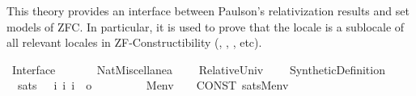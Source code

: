 %
\begin{isabellebody}%
%
%
\isadelimdocument
%
\endisadelimdocument
%
\isatagdocument
%
\isamarkuptrue%
%
\endisatagdocument
{\isafolddocument}%
%
\isadelimdocument
%
\endisadelimdocument
%
\begin{isamarkuptext}%
This theory provides an interface between Paulson's
relativization results and set models of ZFC. In particular,
it is used to prove that the locale  is
a sublocale of all relevant locales in ZF-Constructibility
(, , , etc).%
\end{isamarkuptext}\isamarkuptrue%
%
\isadelimtheory
%
\endisadelimtheory
%
\isatagtheory
{}\isamarkupfalse%
\ Interface\isanewline
\ \ \isanewline
\ \ \ \ Nat{\isacharunderscore}{\kern0pt}Miscellanea\isanewline
\ \ \ \ Relative{\isacharunderscore}{\kern0pt}Univ\isanewline
\ \ \ \ Synthetic{\isacharunderscore}{\kern0pt}Definition\isanewline
{}%
\endisatagtheory
{\isafoldtheory}%
%
\isadelimtheory
%
\endisadelimtheory
\isanewline
\isanewline
{}\isamarkupfalse%
\isanewline
\ \ {\isachardoublequoteopen}{\isacharunderscore}{\kern0pt}sats{\isachardoublequoteclose}\ \ {\isacharcolon}{\kern0pt}{\isacharcolon}{\kern0pt}\ {\isachardoublequoteopen}{\isacharbrackleft}{\kern0pt}i{\isacharcomma}{\kern0pt}\ i{\isacharcomma}{\kern0pt}\ i{\isacharbrackright}{\kern0pt}\ {\isasymRightarrow}\ o{\isachardoublequoteclose}\ \ {\isacharparenleft}{\kern0pt}{\isachardoublequoteopen}{\isacharparenleft}{\kern0pt}{\isacharunderscore}{\kern0pt}{\isacharcomma}{\kern0pt}\ {\isacharunderscore}{\kern0pt}\ {\isasymTurnstile}\ {\isacharunderscore}{\kern0pt}{\isacharparenright}{\kern0pt}{\isachardoublequoteclose}\ {\isacharbrackleft}{\kern0pt}{}{}{\isacharcomma}{\kern0pt}{}{}{\isacharcomma}{\kern0pt}{}{}{\isacharbrackright}{\kern0pt}\ {}{}{\isacharparenright}{\kern0pt}\isanewline
{}\isamarkupfalse%
\isanewline
\ \ {\isachardoublequoteopen}{\isacharparenleft}{\kern0pt}M{\isacharcomma}{\kern0pt}env\ {\isasymTurnstile}\ {\isasymphi}{\isacharparenright}{\kern0pt}{\isachardoublequoteclose}\ {\isasymrightleftharpoons}\ {\isachardoublequoteopen}CONST\ sats{\isacharparenleft}{\kern0pt}M{\isacharcomma}{\kern0pt}{\isasymphi}{\isacharcomma}{\kern0pt}env{\isacharparenright}{\kern0pt}{\isachardoublequoteclose}\isanewline

\end{isabellebody}
